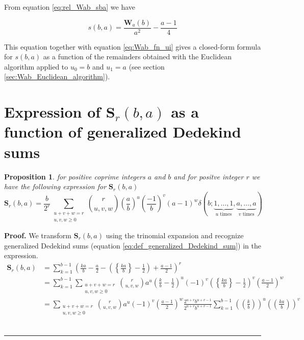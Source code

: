 \documentclass{article}%
\newtheorem{proposition}[theorem]{Proposition}
\newenvironment{proof}[1][Proof]{\textbf{#1.} }{\ \rule{0.5em}{0.5em}}
\newcommand{\SUMS}[3]{\mathbf{S}_{#1}\left(#2,#3\right)}
\newcommand{\SUMW}[2]{\mathbf{W}_{#1}\left(#2\right)}
\newcommand{\doublepariii}[1]{\left(\!\!\!\left(#1\right)\!\!\!\right)}
\begin{document}
From equation \ref{eq:rel_Wab_sba} we have

\begin{equation*}
s(b,a) = \frac{\SUMW{a}{b}}{a^2}-\frac{a-1}{4}
\end{equation*}

This equation together with equation \ref{eq:Wab_fn_ui} gives a closed-form formula for $s(b,a)$ as a function of the remainders obtained with the Euclidean algorithm applied to $u_0=b$ and $u_1=a$ (see section \ref{sec:Wab_Euclidean_algorithm}).

\section{Expression of $\SUMS{r}{b}{a}$ as a function of generalized Dedekind sums}\label{sec:Srba_fn_gen_DedekindSums}

\begin{proposition}\label{prop:Srba_rel_Dedekind_sums} for positive coprime integers $a$ and $b$ and for positve integer $r$ we have the following expression for $\SUMS{r}{b}{a}$
\begin{equation}
\SUMS{r}{b}{a} = \frac{b}{2^r}\sum_{\substack{u+v+w=r\\u,v,w\geq 0}}\binom{r}{u,v,w}\left(\frac{a}{b}\right)^u\left(\frac{-1}{b}\right)^v
(a-1)^w \delta(b;\underbrace{1,\ldots,1}_{u\textrm{ times}},\underbrace{a,\ldots ,a}_{v\textrm{ times}})
\label{eq:Srba_rel_Dedekind_sums}
\end{equation}
\end{proposition}

\begin{proof} We transform $\SUMS{r}{b}{a}$ using the trinomial expansion and recognize generalized Dedekind sums (equation \ref{eq:def_generalized_Dedekind_sum}) in the expression.
\begin{align*}
\SUMS{r}{b}{a} 
&= \sum_{k=1}^{b-1}\left(\frac{ka}{b}-\frac{a}{2}-\left(\left\{\frac{ka}{b}\right\}-\frac{1}{2}\right)+\frac{a-1}{2}\right)^r \\
&= \sum_{k=1}^{b-1} \sum_{\substack{u+v+w=r\\u,v,w\geq 0}}\binom{r}{u,v,w}a^u\left(\frac{k}{b}-\frac{1}{2}\right)^u(-1)^v\left(\left\{\frac{ka}{b}\right\}-\frac{1}{2}\right)^v \left(\frac{a-1}{2}\right)^w \\
&=  \sum_{\substack{u+v+w=r\\u,v,w\geq 0}}\binom{r}{u,v,w}a^u(-1)^v \left(\frac{a-1}{2}\right)^w \frac{2^{u+v}b^{u+v-1}}{2^{u+v}b^{u+v-1}} \sum_{k=1}^{b-1} \doublepariii{\frac{k}{b}}^u\doublepariii{\frac{ka}{b}}^v
\end{align*}
\end{proof}
\end{document}

